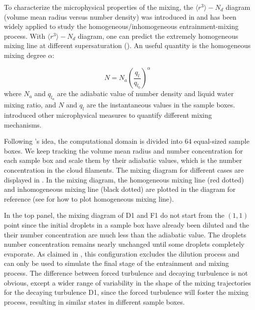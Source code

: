 \documentclass[draft,jgrga]{AGUTeX}
\begin{document}
\begin{article}
To characterize the microphysical properties of the mixing, the $\langle r^3\rangle -N_d$ diagram (volume mean radius versus number density) was introduced in \cite{Burnet07} and has been widely applied to study the homogeneous/inhomogeneous entrainment-mixing process. With $\langle r^3\rangle -N_d$ diagram, one can predict the extremely homogeneous mixing line at different supersaturation (\cite{Lehmann09,Kumar14}). An useful quantity is the homogeneous mixing degree $\alpha$:

\begin{equation}
N=N_{a}(\frac{q_l}{q_{l_0}})^{\alpha}\label{eq:alpha}
\end{equation}
where $N_{a}$ and $q_{l_a}$ are the adiabatic value of number density and liquid water mixing ratio, and $N$ and $q_{l}$ are the instantaneous values in the sample boxes. \cite{Lu2011} introduced other microphysical measures to quantify different mixing mechanisms.

Following \cite{Kumar14}'s idea, the computational domain is divided into $64$ equal-sized sample boxes. We keep tracking the volume mean radius and number concentration for each sample box and scale them by their adiabatic values, which is the number concentration in the cloud filaments. The mixing diagram for different cases are displayed in . In the mixing diagram, the homogeneous mixing line (red dotted) and inhomogeneous mixing line (black dotted) are plotted in the diagram for reference (see \cite{Burnet07} for how to plot homogeneous mixing line). 

In the top panel, the mixing diagram of D1 and F1 do not start from the $(1,1)$ point since the initial droplets in a sample box have already been diluted and the their number concentration are much less than the adiabatic value. The droplets number concentration remains nearly unchanged until some droplets completely evaporate. As claimed in \cite{And04}, this configuration excludes the dilution process and can only be used to simulate the final stage of the entrainment and mixing process. The difference between forced turbulence and decaying turbulence is not obvious, except a wider range of variability in the shape of the mixing trajectories for the decaying turbulence D1, since the forced turbulence will foster the mixing process, resulting in similar states in different sample boxes.


\end{article}
\end{document}

